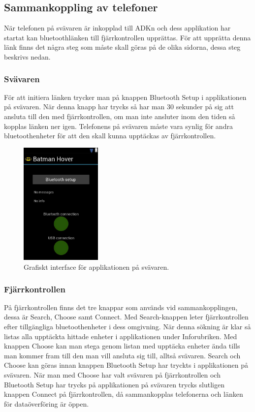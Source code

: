 \subsection{Sammankoppling av telefoner}

När telefonen på svävaren är inkopplad till ADKn och dess applikation har startat kan
bluetoothlänken till fjärrkontrollen upprättas. För att upprätta denna länk finns det några steg som måste skall göras på de olika sidorna, dessa steg beskrivs nedan.

\subsubsection{Svävaren}

För att initiera länken trycker man på knappen Bluetooth Setup i applikationen på svävaren.
När denna knapp har trycks så har man 30 sekunder på sig att ansluta till den med fjärrkontrollen, om man inte ansluter inom den tiden så kopplas länken ner igen.
Telefonens på svävaren måste vara synlig för andra bluetoothenheter för att den skall kunna upptäckas av fjärrkontrollen.

\begin{figure}[htbp!]
\centering
\includegraphics[width=4cm]{../../includes/figures/hoverApp.png}
\caption{Grafiskt interface för applikationen på svävaren.}
\label{fig:hoverApp}
\end{figure}


\subsubsection{Fjärrkontrollen}

På fjärrkontrollen finns det tre knappar som används vid sammankopplingen, dessa är Search, Choose samt Connect. Med Search-knappen leter fjärrkontrollen efter tillgängliga bluetoothenheter i dess omgivning. När denna sökning är klar så listas alla upptäckta hittade enheter i applikationen under Inforubriken. Med knappen Choose kan man stega genom listan med upptäcka enheter ända tills man kommer fram till den man vill ansluta sig till, alltså svävaren.
Search och Choose kan göras innan knappen Bluetooth Setup har tryckts i applikationen på svävaren. När man med Choose har valt svävaren på fjärrkontrollen och Bluetooth Setup har trycks på applikationen på svävaren trycks slutligen knappen Connect på fjärrkontrollen, då sammankopplas telefonerna och länken för dataöverföring är öppen.


